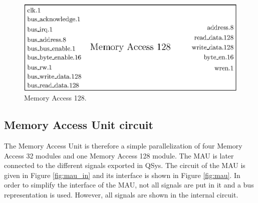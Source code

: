 \begin{figure}[ht!]
    \center
    \includegraphics[scale=0.8]{"Chapter5-MAU_CTRLU/res/memory_access_128"}
    \caption{Memory Access 128.}
    \label{fig:ma128}
\end{figure}

\subsection{Memory Access Unit circuit}

The Memory Access Unit is therefore a simple parallelization of four Memory Access 32 modules and 
one Memory Access 128 module. The MAU is later connected to the different signals exported in 
QSys. The circuit of the MAU is given in Figure \ref{fig:mau_in} and its interface is shown in 
Figure \ref{fig:mau}. In order to simplify the interface of the MAU, not all signals are put in it 
and a bus representation is used. However, all signals are shown in the internal circuit.

